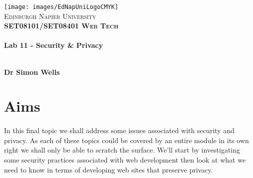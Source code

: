 \documentclass[10pt, a4paper, twosize]{article}
\begin{document}

\begin{titlepage}
\vspace*{5cm}
\begin{center}
\texttt{[image: images/EdNapUniLogoCMYK]}~\\[1cm]

\textsc{\Large Edinburgh Napier University}\\[1.5cm]

\textsc{\LARGE \bfseries SET08101/SET08401 Web Tech}\\[0.5cm]

\hrulefill \\[0.4cm]
{\huge \bfseries Lab 11 - Security \& Privacy  \\[0.4cm] }
\hrulefill \\[1.5cm]

\begin{minipage}{0.4\textwidth}
\begin{flushleft} \large
\textbf{Dr Simon Wells} \\
\end{flushleft}
\end{minipage}

\vfill

\end{center}
\end{titlepage}




%

\section*{Aims}
\paragraph{} In this final topic we shall address some issues associated with security and privacy. As each of these topics could be covered by an entire module in its own right we shall only be able to scratch the surface. We'll start by investigating some security practices associated with web development then look at what we need to know in terms of developing web sites that preserve privacy.
\end{document}
